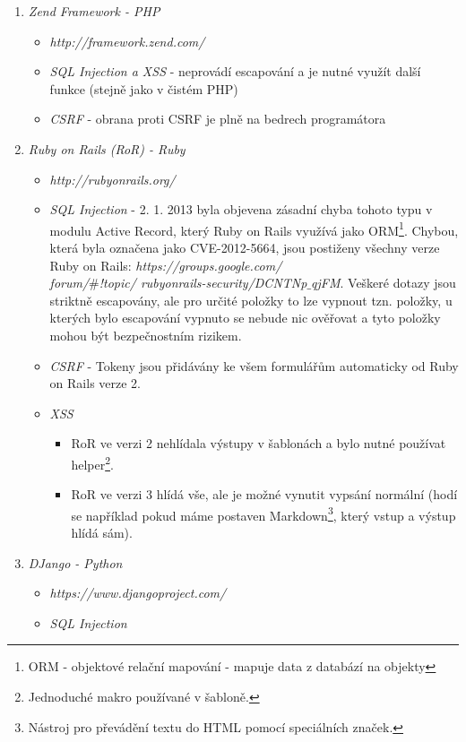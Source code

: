\begin{enumerate}
\item \textit{Zend Framework - PHP} 
\begin{itemize}
\item \textit{http://framework.zend.com/}
\item \textit{SQL Injection a XSS} - neprovádí escapování a je nutné využít další funkce (stejně jako v čistém PHP)
\item \textit{CSRF} - obrana proti CSRF je plně na bedrech programátora
\end{itemize}
\item \textit{Ruby on Rails (RoR) - Ruby}
\begin{itemize}
\item \textit{http://rubyonrails.org/}
\item \textit{SQL Injection} - 2. 1. 2013 byla objevena zásadní chyba tohoto typu v modulu Active Record, který Ruby on Rails využívá jako ORM\footnote{ORM - objektové relační mapování - mapuje data z databází na objekty}. Chybou, která byla označena jako CVE-2012-5664, jsou postiženy všechny verze Ruby on Rails: \textit{https://groups.google.com/\\forum/$\#$!topic/ rubyonrails-security/DCNTNp$\_$qjFM}. Veškeré dotazy jsou striktně escapovány, ale pro určité položky to lze vypnout tzn. položky, u kterých bylo escapování vypnuto se nebude nic ověřovat a tyto položky mohou být bezpečnostním rizikem.
\item \textit{CSRF} - Tokeny jsou přidávány ke všem formulářům automaticky od Ruby on Rails verze 2.
\item \textit{XSS} 
\begin{itemize}
\item RoR ve verzi 2 nehlídala výstupy v šablonách a bylo nutné používat helper\footnote{Jednoduché makro používané v šabloně.}.
\item RoR ve verzi 3 hlídá vše, ale je možné vynutit vypsání normální (hodí se například pokud máme  postaven Markdown\footnote{Nástroj pro převádění textu do HTML pomocí speciálních značek.}, který vstup a výstup hlídá sám).
\end{itemize}
\end{itemize} 
\item \textit{DJango - Python}
\begin{itemize}
\item \textit{https://www.djangoproject.com/}
\item \textit{SQL Injection}
\begin{itemize}

\end{itemize}
\end{itemize}
\end{enumerate}
